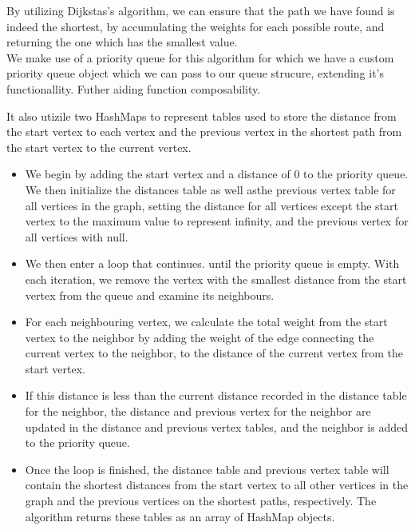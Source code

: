\documentclass[a4paper]{article}
\begin{document}
By utilizing Dijkstas's algorithm, we can ensure that the path we have found is indeed the shortest, 
by accumulating the weights for each possible route, and returning the one which has the smallest value. \\

We make use of a priority queue for this algorithm for which we have a custom priority queue object 
which we can pass to our queue strucure, extending it's functionallity. Futher aiding function composability. \\
\newpage

It also utizile two HashMaps to represent tables used to store the distance from the start vertex 
to each vertex and the previous vertex in the shortest path from the start vertex to the current vertex. \\

\vspace{8mm}
\begin{itemize}
\item 
We begin by adding the start vertex and a distance of 0 to the priority queue.
We then initialize the distances table as well asthe previous vertex table for all vertices in the graph,
setting the distance for all vertices except the start vertex to the maximum value to represent infinity,
and the previous vertex for all vertices with null. 

\item
We then enter a loop that continues.
until the priority queue is empty.
With each iteration,
we remove the vertex with the smallest distance from the start vertex from the queue
and examine its neighbours. 

\item
For each neighbouring vertex, we calculate the total weight from the start vertex to the neighbor
by adding the weight of the edge connecting the current vertex to the neighbor,
to the distance of the current vertex from the start vertex. \\

\item
If this distance is less than the current distance recorded in the distance table for the neighbor,
the distance and previous vertex for the neighbor are updated in the distance
and previous vertex tables, and the neighbor is added to the priority queue. \\

\item
Once the loop is finished, the distance table and previous vertex table
will contain the shortest distances from the start vertex to all other vertices in the graph
and the previous vertices on the shortest paths, respectively.
The algorithm returns these tables as an array of HashMap objects. \\
\end{itemize}
\vspace{20mm}
\end{document}
